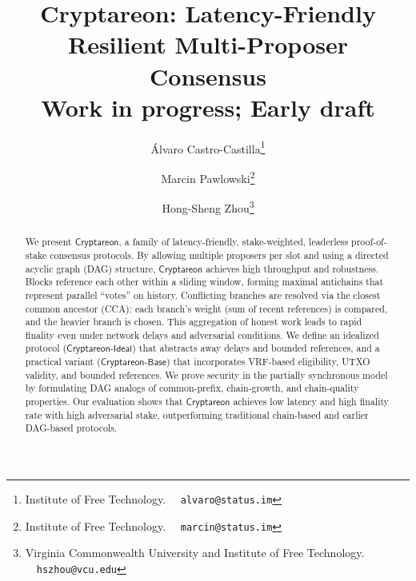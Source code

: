 \documentclass[11pt]{article}
\newcommand{\Proj}{\ensuremath{\mathsf{Cryptareon}}\xspace}
\newcommand{\ProjIdeal}{\ensuremath{\mathsf{Cryptareon\text{-}Ideal}}\xspace}
\newcommand{\ProjBase}{\ensuremath{\mathsf{Cryptareon\text{-}Base}}\xspace}
\begin{document}
\title{
Cryptareon: Latency-Friendly Resilient Multi-Proposer Consensus
\\
{\small {\sc Work in progress; Early draft}}
}
\author{
Álvaro Castro-Castilla\footnote{Institute of Free Technology. \ \ \texttt{alvaro@status.im}}
\and
Marcin Pawlowski\footnote{Institute of Free Technology. \ \ \texttt{marcin@status.im}}
\and
Hong-Sheng Zhou\footnote{Virginia Commonwealth University and Institute of Free Technology. \ \ \texttt{hszhou@vcu.edu}}
}

\maketitle





\setcounter{tocdepth}{3}
\setcounter{secnumdepth}{3}
\pagestyle{plain}

\begin{abstract}
We present \Proj, a family of latency-friendly, stake-weighted, leaderless proof-of-stake consensus protocols. By allowing multiple proposers per slot and using a directed acyclic graph (DAG) structure, \Proj achieves high throughput and robustness. Blocks reference each other within a sliding window, forming maximal antichains that represent parallel “votes” on history. Conflicting branches are resolved via the closest common ancestor (CCA): each branch's weight (sum of recent references) is compared, and the heavier branch is chosen. This aggregation of honest work leads to rapid finality even under network delays and adversarial conditions. We define an idealized protocol (\ProjIdeal) that abstracts away delays and bounded references, and a practical variant (\ProjBase) that incorporates VRF-based eligibility, UTXO validity, and bounded references. We prove security in the partially synchronous model by formulating DAG analogs of common-prefix, chain-growth, and chain-quality properties. Our evaluation shows that \Proj achieves low latency and high finality rate with high adversarial stake, outperforming traditional chain-based and earlier DAG-based protocols.
\end{abstract}

\newpage
\small
\tableofcontents
\normalsize

\newpage
{}
\end{document}
